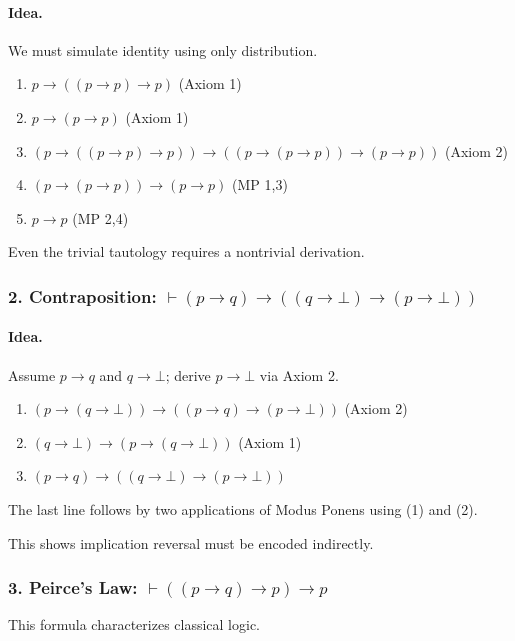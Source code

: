 \documentclass{article}
\begin{document}
\paragraph{Idea.}
We must simulate identity using only distribution.

\begin{enumerate}
    \item $p \to ((p \to p) \to p)$ \hfill (Axiom 1)
    \item $p \to (p \to p)$ \hfill (Axiom 1)
    \item $(p \to ((p \to p) \to p)) \to ((p \to (p \to p)) \to (p \to p))$ \hfill (Axiom 2)
    \item $(p \to (p \to p)) \to (p \to p)$ \hfill (MP 1,3)
    \item $p \to p$ \hfill (MP 2,4)
\end{enumerate}

Even the trivial tautology requires a nontrivial derivation.

\bigskip
\subsubsection*{2. Contraposition: $\vdash (p \to q) \to ((q \to \bot) \to (p \to \bot))$}

\paragraph{Idea.}
Assume $p \to q$ and $q \to \bot$; derive $p \to \bot$ via Axiom 2.

\begin{enumerate}
    \item $(p \to (q \to \bot)) \to ((p \to q) \to (p \to \bot))$ \hfill (Axiom 2)
    \item $(q \to \bot) \to (p \to (q \to \bot))$ \hfill (Axiom 1)
    \item $(p \to q) \to ((q \to \bot) \to (p \to \bot))$
\end{enumerate}

The last line follows by two applications of Modus Ponens
using (1) and (2).

This shows implication reversal must be encoded indirectly.

\bigskip
\subsubsection*{3. Peirce’s Law: $\vdash ((p \to q) \to p) \to p$}

This formula characterizes classical logic.
\end{document}
